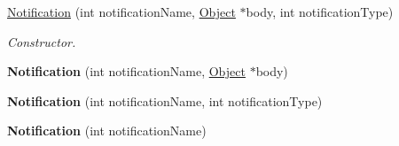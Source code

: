 \begin{DoxyCompactItemize}
\item 
\hyperlink{class_pure_m_v_c_1_1_notification_a6c2e3395ec9cc6f7b6f974ed15107067}{Notification} (int notificationName, \hyperlink{class_pure_m_v_c_1_1_object}{Object} $\ast$body, int notificationType)
\begin{DoxyCompactList}\small\item\em Constructor. \item\end{DoxyCompactList}\item 
\hypertarget{class_pure_m_v_c_1_1_notification_ac192f3b58364e747610eefc72874b253}{
{\bfseries Notification} (int notificationName, \hyperlink{class_pure_m_v_c_1_1_object}{Object} $\ast$body)}
\label{class_pure_m_v_c_1_1_notification_ac192f3b58364e747610eefc72874b253}

\item 
\hypertarget{class_pure_m_v_c_1_1_notification_add584c2f9bd10244a05c37e46f83acf6}{
{\bfseries Notification} (int notificationName, int notificationType)}
\label{class_pure_m_v_c_1_1_notification_add584c2f9bd10244a05c37e46f83acf6}

\item 
\hypertarget{class_pure_m_v_c_1_1_notification_a28757496c5fafbff61c60239ca263b55}{
{\bfseries Notification} (int notificationName)}
\label{class_pure_m_v_c_1_1_notification_a28757496c5fafbff61c60239ca263b55}


\end{DoxyCompactItemize}
